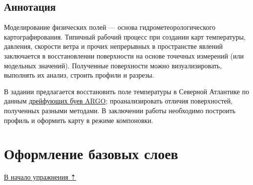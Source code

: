 \documentclass[12pt,]{book}
\begin{document}
\hypertarget{interpolation-annotation}{%
\subsection{Аннотация}\label{interpolation-annotation}}

Моделирование физических полей --- основа гидрометеорологического картографирования. Типичный рабочий процесс при создании карт температуры, давления, скорости ветра и прочих непрерывных в пространстве явлений заключается в восстановлении поверхности на основе точечных измерений (или модельных значений). Полученные поверхности можно визуализировать, выполнять их анализ, строить профили и разрезы.

В задании предлагается восстановить поле температуры в Северной Атлантике по данным \href{http://www.argo.ucsd.edu}{дрейфующих буев ARGO}; проанализировать отличия поверхностей, полученных разными методами. В заключении работы необходимо построить профиль и оформить карту в режиме компоновки.

\hypertarget{interpolation-base}{%
\section{Оформление базовых слоев}\label{interpolation-base}}

\protect\hyperlink{interpolation}{В начало упражнения ⇡}
\end{document}
